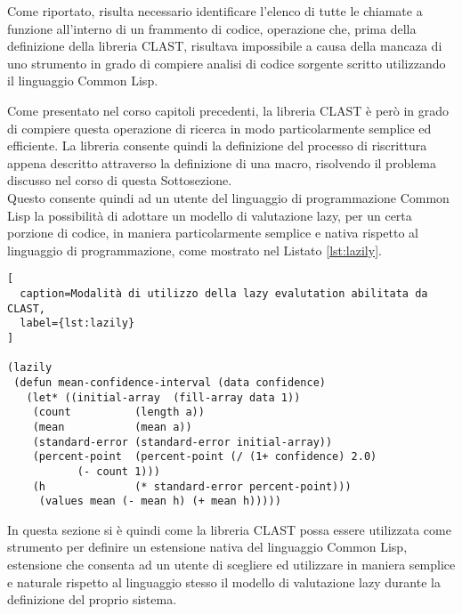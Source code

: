 Come riportato, risulta necessario identificare l'elenco di tutte le chiamate a
funzione all'interno di un frammento di codice, operazione che, prima della
definizione della libreria CLAST, risultava impossibile a causa della mancaza di
uno strumento in grado di compiere analisi di codice sorgente scritto
utilizzando il linguaggio Common Lisp.

Come presentato nel corso capitoli precedenti, la libreria CLAST è però in grado
di compiere questa operazione di ricerca in modo particolarmente semplice ed
efficiente. La libreria consente quindi la definizione del processo di
riscrittura appena descritto attraverso la definizione di una macro, risolvendo
il problema discusso nel corso di questa Sottosezione.\\

Questo consente quindi ad un utente del linguaggio di programmazione Common Lisp
la possibilità di adottare un modello di valutazione lazy, per un certa porzione
di codice, in maniera particolarmente semplice e nativa rispetto al linguaggio
di programmazione, come mostrato nel Listato \ref{lst:lazily}.

\begin{lstlisting}[
  caption=Modalità di utilizzo della lazy evalutation abilitata da CLAST,
  label={lst:lazily}
]

(lazily
 (defun mean-confidence-interval (data confidence)
   (let* ((initial-array  (fill-array data 1))
    (count          (length a))
    (mean           (mean a))
    (standard-error (standard-error initial-array))
    (percent-point  (percent-point (/ (1+ confidence) 2.0)
           (- count 1)))
    (h              (* standard-error percent-point)))
     (values mean (- mean h) (+ mean h)))))

\end{lstlisting}

In questa sezione si è quindi come la libreria CLAST possa essere utilizzata
come strumento per definire un estensione nativa del linguaggio Common Lisp,
estensione che consenta ad un utente di scegliere ed utilizzare in maniera
semplice e naturale rispetto al linguaggio stesso il modello di valutazione lazy
durante la definizione del proprio sistema.
